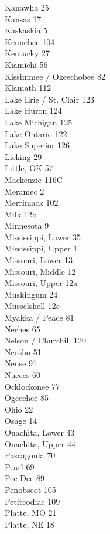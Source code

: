 \documentclass[11pt]{article}
\begin{document}
\begin{multicols}{3}
Kanawha 25\\
Kansas 17\\
Kaskaskia 5\\
Kennebec 104\\
Kentucky 27\\
Kiamichi 56\\
Kissimmee / Okeechobee 82\\
Klamath 112\\
Lake Erie / St. Clair 123\\
Lake Huron 124\\
Lake Michigan 125\\
Lake Ontario 122\\
Lake Superior 126\\
Licking 29\\
Little, OK 57\\
Mackenzie 116C\\
Meramec 2\\
Merrimack 102\\
Milk 12b\\
Minnesota 9\\
Mississippi, Lower 35\\
Mississippi, Upper 1\\
Missouri, Lower 13\\
Missouri, Middle 12\\
Missouri, Upper 12a\\
Muskingum 24\\
Musselshell 12c\\
Myakka / Peace 81\\
Neches 65\\
Nelson / Churchill 120\\
Neosho 51\\
Neuse 91\\
Nueces 60\\
Ocklockonee 77\\
Ogeechee 85\\
Ohio 22\\
Osage 14\\
Ouachita, Lower 43\\
Ouachita, Upper 44\\
Pascagoula 70\\
Pearl 69\\
Pee Dee 89\\
Penobscot 105\\
Petitcodiac 109\\
Platte, MO 21\\
Platte, NE 18\\

\end{multicols}
\end{document}

